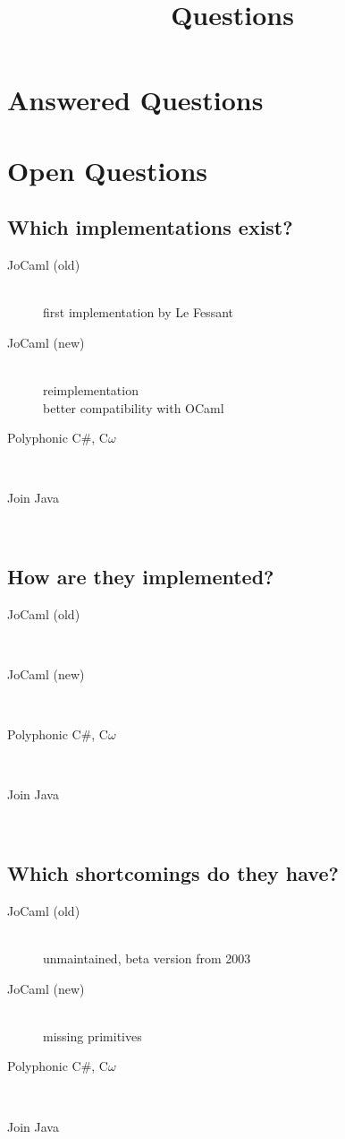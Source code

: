 \documentclass[12pt]{article}
\newcommand{\question}[2]{\subsection{#1}#2}
\begin{document}
\title{Questions}
\maketitle
\vspace{3cm}
\tableofcontents
\pagebreak


\section{Answered Questions}


\section{Open Questions}

  \question{Which implementations exist?}{
    \begin{description}
      \item[JoCaml (old)]\mbox{}\\
        first implementation by Le Fessant
      \item[JoCaml (new)]\mbox{}\\
        reimplementation \\
        better compatibility with OCaml
      \item[Polyphonic C\#, C$\omega$]\mbox{}\\
      \item[Join Java]\mbox{}\\
    \end{description}
  }

  \question{How are they implemented?}{
    \begin{description}
      \item[JoCaml (old)]\mbox{}\\
      \item[JoCaml (new)]\mbox{}\\
      \item[Polyphonic C\#, C$\omega$]\mbox{}\\
      \item[Join Java]\mbox{}\\
    \end{description}
  }

  \question{Which shortcomings do they have?}{
    \begin{description}
      \item[JoCaml (old)]\mbox{}\\
        unmaintained,
        beta version from 2003
      \item[JoCaml (new)]\mbox{}\\
        missing primitives
      \item[Polyphonic C\#, C$\omega$]\mbox{}\\
      \item[Join Java]\mbox{}\\
    \end{description}
  }
\end{document}
